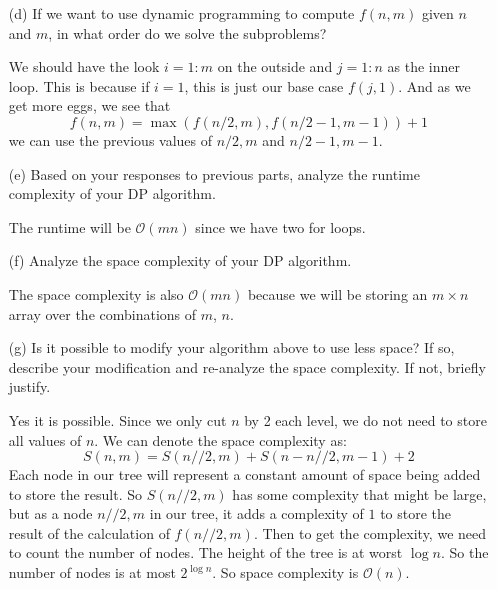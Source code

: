 \documentclass{article}
\begin{document}
\begin{itemize}
        \item [(d)] If we want to use dynamic programming to compute $f(n, m)$ given $n$ and $m$, in what order do we solve the subproblems?
            \begin{answer}
                We should have the look $i = 1:m$ on the outside and $j = 1:n$ as the inner loop. This is because if $i = 1$, this is just our base case $f(j, 1)$. And as we get more eggs, we see that
                    \begin{equation*}
                        f(n, m) = \max(f(n / 2, m), f(n / 2 - 1, m - 1)) + 1
                    \end{equation*}
                we can use the previous values of $n / 2, m$ and $n / 2 - 1, m - 1$.
            \end{answer}

        \item [(e)] Based on your responses to previous parts, analyze the runtime complexity of your DP algorithm.
            \begin{answer}
                The runtime will be $\mathcal{O}(mn)$ since we have two for loops.
            \end{answer}

        \item [(f)] Analyze the space complexity of your DP algorithm.
            \begin{answer}
                The space complexity is also $\mathcal{O}(mn)$ because we will be storing an $m \times n$ array over the combinations of $m$, $n$.
            \end{answer}

        \item [(g)] Is it possible to modify your algorithm above to use less space? If so, describe your modification and re-analyze the space complexity. If not, briefly justify.
            \begin{answer}
                Yes it is possible. Since we only cut $n$ by 2 each level, we do not need to store all values of $n$. We can denote the space complexity as:
                    \begin{equation*}
                        S(n, m) = S(n // 2, m) + S(n - n // 2, m - 1) + 2
                    \end{equation*}
                Each node in our tree will represent a constant amount of space being added to store the result. So $S(n // 2, m)$ has some complexity that might be large, but as a node $n // 2, m$ in our tree, it adds a complexity of $1$ to store the result of the calculation of $f(n // 2, m)$. Then to get the complexity, we need to count the number of nodes. The height of the tree is at worst $\log{n}$. So the number of nodes is at most $2^{\log{n}}$. So space complexity is $\mathcal{O}(n)$.
            \end{answer}
    \end{itemize}
\end{document}
